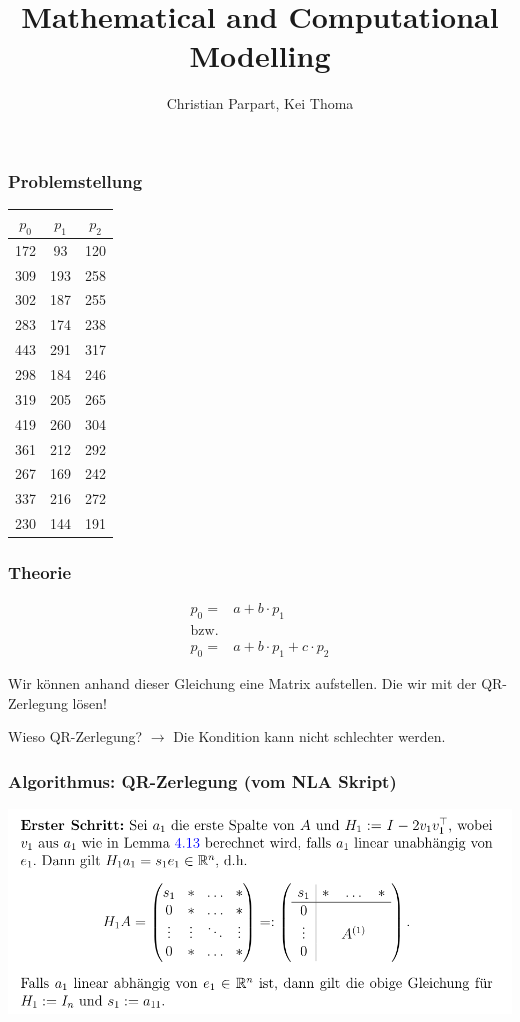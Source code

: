 \documentclass{beamer}
\title{Mathematical and Computational Modelling}
\author{Christian Parpart, Kei Thoma}
\date{} %
\begin{document}
\begin{frame}
\frametitle{Problemstellung}

\begin{center}
\begin{tabular}{ c c c }
$p_0$ & $p_1$ & $p_2$ \\
\hline
172 & 93 & 120 \\
309 & 193 & 258 \\
302 & 187 & 255 \\
283 & 174 & 238 \\
443 & 291 & 317 \\
298 & 184 & 246 \\
319 & 205 & 265 \\
419 & 260 & 304 \\
361 & 212 & 292 \\
267 & 169 & 242 \\
337 & 216 & 272 \\
230 & 144 & 191
\end{tabular}
\end{center}

\end{frame}

\begin{frame}
\frametitle{Theorie}
\begin{align*}
p_0 =& a + b \cdot p_1 \\
\text{bzw.} \\
p_0 =& a + b \cdot p_1 + c \cdot p_2
\end{align*}

Wir können anhand dieser Gleichung eine Matrix aufstellen. Die wir mit der QR-Zerlegung lösen!

Wieso QR-Zerlegung? $\rightarrow$ Die Kondition kann nicht schlechter werden.

\end{frame}

\begin{frame}
\frametitle{Algorithmus: QR-Zerlegung (vom NLA Skript)}
\includegraphics[width=\textwidth]{alg1.png}
\end{frame}
\end{document}
